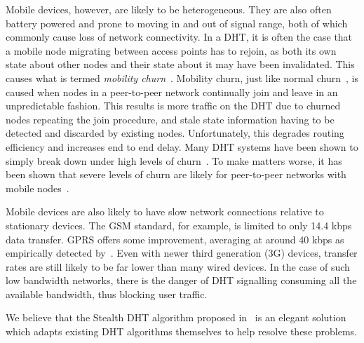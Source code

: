 \documentclass[times, 10pt,twocolumn]{article}
\begin{document}
Mobile devices, however, are likely to be heterogeneous. They are
also often battery powered and prone to moving in and out of signal
range, both of which commonly cause loss of network connectivity. In
a DHT, it is often the case that a mobile node migrating between
access points has to rejoin, as both its own state about other nodes
and their state about it may have been invalidated. This causes what
is termed {\em mobility churn}~\cite{mobilechurn}. Mobility churn,
just like normal churn~\cite{churn1}, is caused when nodes in a
peer-to-peer network continually join and leave in an unpredictable
fashion. This results is more traffic on the DHT due to churned nodes %
repeating the join procedure, and stale state information having to
be detected and discarded by existing nodes. Unfortunately, this
degrades routing efficiency and increases end to end delay. Many DHT
systems have been shown to simply break down under high levels of
churn~\cite{dhtcomparison}\cite{churn1}. To make matters worse, it
has been shown that severe levels of churn are likely for
peer-to-peer networks with mobile
nodes~\cite{mobilechurn}\cite{dhtmanet01}.

Mobile devices  are also likely to have slow network connections
relative to stationary devices. The GSM standard, for example, is
limited to only 14.4 kbps data transfer. GPRS offers some
improvement, averaging at around 40 kbps as empirically detected
by~\cite{mobilep2p3}. Even with newer third generation (3G) devices,
transfer rates are still likely to be far lower than many wired
devices. In the case of such low bandwidth networks, there is the
danger of DHT signalling consuming all the available bandwidth, thus
blocking user traffic.

We believe that the Stealth DHT algorithm proposed
in~\cite{stealth1} is an elegant solution which adapts existing DHT
algorithms themselves to help resolve these problems.

\end{document}
